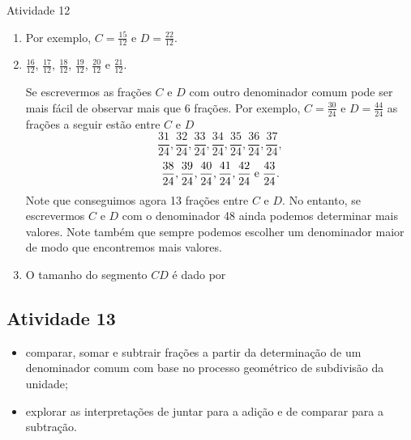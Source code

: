 \begin{multicols}{2}
\begin{resposta*}{Atividade 12}
\begin{enumerate} [\quad a)] %
  \item         Por exemplo, $C=\frac{15}{12}$     e     $D=\frac{22}{12}$.
  \item         $\frac{16}{12}$,     $\frac{17}{12}$,     $\frac{18}{12}$,     $\frac{19}{12}$,     $\frac{20}{12}$     e     $\frac{21}{12}$.

  Se escrevermos as frações     $C$     e     $D $     com outro denominador comum pode ser mais fácil de observar mais que 6 frações. Por exemplo,     $C=\frac{30}{24}$     e     $D=\frac{44}{24}$     as frações a seguir estão entre     $C$     e     $D$ $$\frac{31}{24}, \frac{32}{24}, \frac{33}{24}, \frac{34}{24}, \frac{35}{24}, \frac{36}{24}, \frac{37}{24},$$
  $$\frac{38}{24}, \frac{39}{24}, \frac{40}{24}, \frac{41}{24}, \frac{42}{24}\; {\rm e }\; \frac{43}{24}.$$
  Note que conseguimos agora 13 frações entre     $C$     e     $D$. No entanto, se escrevermos     $C$     e     $D$     com o denominador 48 ainda podemos determinar mais valores. Note também que sempre podemos escolher um denominador maior de modo que encontremos mais valores.
  \item     O tamanho do segmento     $CD$     é dado por
\end{enumerate} %
\end{resposta*}




\subsection{Atividade 13}

  \newline \vspace{.15cm}

  \begin{itemize} %
    \item       comparar, somar e subtrair frações a partir da determinação de um denominador comum com base no processo geométrico de subdivisão da unidade;
    \item       explorar as interpretações de juntar para a adição e de comparar para a subtração.
\end{itemize} %


   \vspace{.15cm}


\end{multicols}
